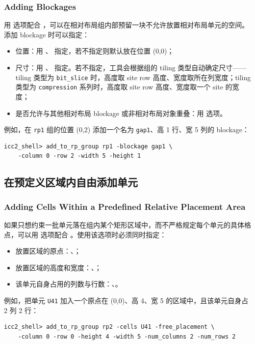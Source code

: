 \subsubsection*{Adding Blockages}

用  选项配合 ，可以在相对布局组内部预留一块不允许放置相对布局单元的空间。添加 blockage 时可以指定：
\begin{itemize}
  \item 位置：用 、 指定，若不指定则默认放在位置 (0,0)；
  \item 尺寸：用 、 指定。若不指定，工具会根据组的 tiling 类型自动确定尺寸——tiling 类型为 \texttt{bit\_slice} 时，高度取 site row 高度、宽度取所在列宽度；tiling 类型为 \texttt{compression} 系列时，高度取 site row 高度、宽度取一个 site 的宽度；
  \item 是否允许与其他相对布局 blockage 或非相对布局对象重叠：用  选项。
\end{itemize}

例如，在 \texttt{rp1} 组的位置 (0,2) 添加一个名为 \texttt{gap1}、高 1 行、宽 5 列的 blockage：
\begin{lstlisting}
icc2_shell> add_to_rp_group rp1 -blockage gap1 \
    -column 0 -row 2 -width 5 -height 1
\end{lstlisting}

\subsection{在预定义区域内自由添加单元}
\subsubsection*{Adding Cells Within a Predefined Relative Placement Area}

如果只想约束一批单元落在组内某个矩形区域中，而不严格规定每个单元的具体格点，可以用  选项配合 。使用该选项时必须同时指定：
\begin{itemize}
  \item 放置区域的原点：、；
  \item 放置区域的高度和宽度：、；
  \item 该单元自身占用的列数与行数：、。
\end{itemize}

例如，把单元 \texttt{U41} 加入一个原点在 (0,0)、高 4、宽 5 的区域中，且该单元自身占 2 列 2 行：
\begin{lstlisting}
icc2_shell> add_to_rp_group rp2 -cells U41 -free_placement \
    -column 0 -row 0 -height 4 -width 5 -num_columns 2 -num_rows 2
\end{lstlisting}

